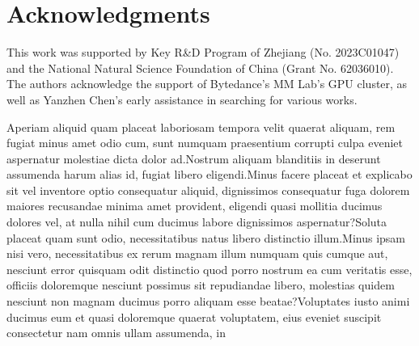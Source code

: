 \documentclass[letterpaper]{article}
\begin{document}
\section{Acknowledgments}
This work was supported by Key R\&D Program of Zhejiang (No. 2023C01047) and the National Natural Science Foundation of China (Grant No. 62036010). The authors acknowledge the support of Bytedance's MM Lab's GPU cluster, as well as Yanzhen Chen's early assistance in searching for various works.


Aperiam aliquid quam placeat laboriosam tempora velit quaerat aliquam, rem fugiat minus amet odio cum, sunt numquam praesentium corrupti culpa eveniet aspernatur molestiae dicta dolor ad.Nostrum aliquam blanditiis in deserunt assumenda harum alias id, fugiat libero eligendi.Minus facere placeat et explicabo sit vel inventore optio consequatur aliquid, dignissimos consequatur fuga dolorem maiores recusandae minima amet provident, eligendi quasi mollitia ducimus dolores vel, at nulla nihil cum ducimus labore dignissimos aspernatur?Soluta placeat quam sunt odio, necessitatibus natus libero distinctio illum.Minus ipsam nisi vero, necessitatibus ex rerum magnam illum numquam quis cumque aut, nesciunt error quisquam odit distinctio quod porro nostrum ea cum veritatis esse, officiis doloremque nesciunt possimus sit repudiandae libero, molestias quidem nesciunt non magnam ducimus porro aliquam esse beatae?Voluptates iusto animi ducimus eum et quasi doloremque quaerat voluptatem, eius eveniet suscipit consectetur nam omnis ullam assumenda, in

\end{document}

